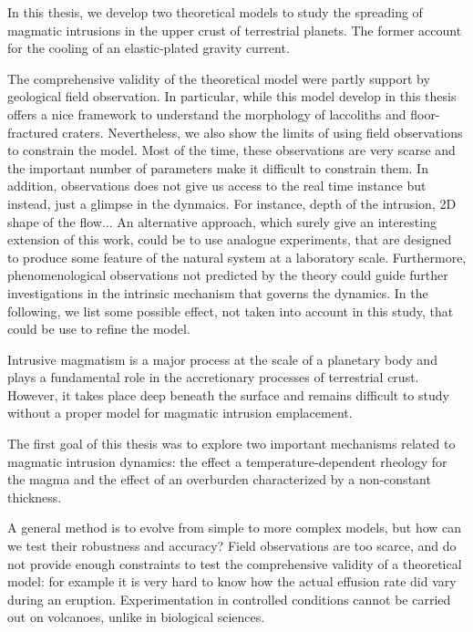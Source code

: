 In  this  thesis, we  develop  two  theoretical  models to  study  the
spreading of  magmatic intrusions  in the  upper crust  of terrestrial
planets.   The former  account for  the cooling  of an  elastic-plated
gravity current.



The  comprehensive  validity  of  the theoretical  model  were  partly
support by  geological field  observation.  In particular,  while this
model develop in this thesis offers a nice framework to understand the
morphology of laccoliths and floor-fractured craters. Nevertheless, we
also  show the  limits of  using field  observations to  constrain the
model. Most  of the time, these  observations are very scarse  and the
important number of parameters make it difficult to constrain them. In
addition,  observations does  not  give  us access  to  the real  time
instance but instead,  just a glimpse in the  dynmaics.  For instance,
depth  of the  intrusion,  2D  shape of  the  flow...  An  alternative
approach, which  surely give  an interesting  extension of  this work,
could be  to use  analogue experiments, that  are designed  to produce
some feature of the natural system at a laboratory scale. Furthermore,
phenomenological observations not predicted  by the theory could guide
further  investigations in  the intrinsic  mechanism that  governs the
dynamics.  In the  following, we list some possible  effect, not taken
into account in this study, that could be use to refine the model.

Intrusive magmatism  is a major  process at  the scale of  a planetary
body and  plays a  fundamental role in  the accretionary  processes of
terrestrial crust.  However,  it takes place deep  beneath the surface
and remains  difficult to  study without a  proper model  for magmatic
intrusion emplacement.

The first goal of this thesis  was to explore two important mechanisms
related    to   magmatic    intrusion   dynamics:    the   effect    a
temperature-dependent  rheology for  the magma  and the  effect of  an
overburden characterized by a non-constant thickness.




A general method is to evolve  from simple to more complex models, but
how can we test their  robustness and accuracy? Field observations are
too  scarce,  and  do  not  provide enough  constraints  to  test  the
comprehensive validity of a theoretical  model: for example it is very
hard  to  know  how  the  actual effusion  rate  did  vary  during  an
eruption. Experimentation  in controlled conditions cannot  be carried
out on volcanoes, unlike in biological sciences.

